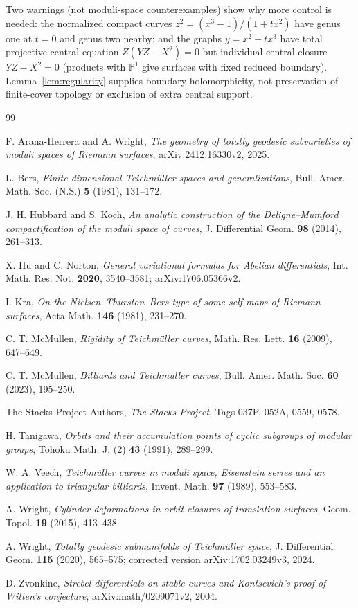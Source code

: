 \documentclass[11pt]{article}
\theoremstyle{remark}
\begin{document}
Two warnings (not moduli-space counterexamples) show why more
control is needed: the normalized compact curves
\(z^2=(x^3-1)/(1+tx^2)\) have genus one at \(t=0\) and genus two
nearby; and the graphs \(y=x^2+tx^3\) have total projective central
equation \(Z(YZ-X^2)=0\) but individual central closure
\(YZ-X^2=0\) (products with \(\mathbb P^1\) give surfaces with fixed
reduced boundary). Lemma~\ref{lem:regularity} supplies boundary
holomorphicity, not preservation of finite-cover topology or
exclusion of extra central support.

\begin{thebibliography}{99}

F. Arana-Herrera and A. Wright,
\emph{The geometry of totally geodesic subvarieties of moduli spaces
of Riemann surfaces}, arXiv:2412.16330v2, 2025.

L. Bers,
\emph{Finite dimensional Teichm\"uller spaces and generalizations},
Bull. Amer. Math. Soc. (N.S.) \textbf{5} (1981), 131--172.

J. H. Hubbard and S. Koch,
\emph{An analytic construction of the Deligne--Mumford
compactification of the moduli space of curves},
J. Differential Geom. \textbf{98} (2014), 261--313.

X. Hu and C. Norton,
\emph{General variational formulas for Abelian differentials},
Int. Math. Res. Not. \textbf{2020}, 3540--3581; arXiv:1706.05366v2.

I. Kra,
\emph{On the Nielsen--Thurston--Bers type of some self-maps
of Riemann surfaces},
Acta Math. \textbf{146} (1981), 231--270.

C. T. McMullen,
\emph{Rigidity of Teichm\"uller curves},
Math. Res. Lett. \textbf{16} (2009), 647--649.

C. T. McMullen,
\emph{Billiards and Teichm\"uller curves},
Bull. Amer. Math. Soc. \textbf{60} (2023), 195--250.

The Stacks Project Authors,
\emph{The Stacks Project}, Tags 037P, 052A, 0559, 0578.

H. Tanigawa,
\emph{Orbits and their accumulation points of cyclic subgroups
of modular groups},
Tohoku Math. J. (2) \textbf{43} (1991), 289--299.

W. A. Veech,
\emph{Teichm\"uller curves in moduli space, Eisenstein series and
an application to triangular billiards},
Invent. Math. \textbf{97} (1989), 553--583.

A. Wright,
\emph{Cylinder deformations in orbit closures of translation surfaces},
Geom. Topol. \textbf{19} (2015), 413--438.

A. Wright,
\emph{Totally geodesic submanifolds of Teichm\"uller space},
J. Differential Geom. \textbf{115} (2020), 565--575;
corrected version arXiv:1702.03249v3, 2024.

D. Zvonkine,
\emph{Strebel differentials on stable curves and
Kontsevich's proof of Witten's conjecture},
arXiv:math/0209071v2, 2004.

\end{thebibliography}
\end{document}
